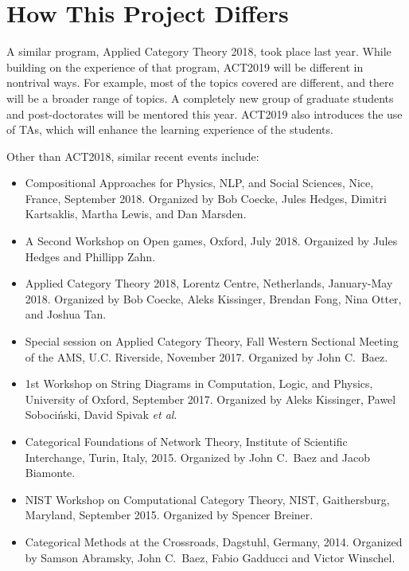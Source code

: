 \documentclass[12pt]{amsart}
\begin{document}

\section{How This Project Differs}

A similar program, Applied Category Theory 2018, took place last year.
While building on the experience of that program, ACT2019 will be
different in nontrival ways.  For example, most of the topics covered
are different, and there will be a broader range of topics.  A
completely new group of graduate students and post-doctorates will be
mentored this year.  ACT2019 also introduces the use of TAs, which
will enhance the learning experience of the students.

Other than ACT2018, similar recent events include:

\begin{itemize}
\item
  Compositional Approaches for Physics, NLP, and Social Sciences,
  Nice, France, September 2018. Organized by Bob Coecke, Jules Hedges,
  Dimitri Kartsaklis, Martha Lewis, and Dan Marsden.
\item
  A Second Workshop on Open games, Oxford, July 2018. Organized by
  Jules Hedges and Phillipp Zahn.
\item
  Applied Category Theory 2018, Lorentz Centre, Netherlands,
  January-May 2018. Organized by Bob Coecke, Aleks Kissinger, Brendan
  Fong, Nina Otter, and Joshua Tan.
\item
  Special session on Applied Category Theory, Fall Western Sectional
  Meeting of the AMS, U.C. Riverside, November 2017.  Organized by
  John C.\ Baez.
\item
  1st Workshop on String Diagrams in Computation, Logic, and Physics,
  University of Oxford, September 2017.  Organized by Aleks Kissinger,
  Pawel Soboci\'nski, David Spivak \textit{et al}.
\item
  Categorical Foundations of Network Theory, Institute of Scientific
  Interchange, Turin, Italy, 2015.  Organized by John C.\ Baez and
  Jacob Biamonte.
\item
  NIST Workshop on Computational Category Theory, NIST, Gaithersburg,
  Maryland, September 2015.  Organized by Spencer Breiner.
\item
  Categorical Methods at the Crossroads, Dagstuhl, Germany, 2014.
  Organized by Samson Abramsky, John C.\ Baez, Fabio Gadducci and
  Victor Winschel.
\end{itemize}
\end{document}
